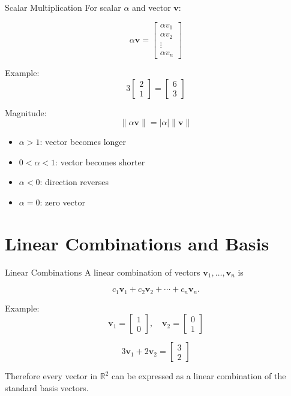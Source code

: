 \documentclass[aspectratio=169]{beamer}
\begin{document}
\begin{frame}{Scalar Multiplication}
For scalar $\alpha$ and vector $\mathbf v$:

\[
\alpha\mathbf v=
\begin{bmatrix}
\alpha v_1\\
\alpha v_2\\
\vdots\\
\alpha v_n
\end{bmatrix}
\]

Example:
\[
3\begin{bmatrix}2\\1\end{bmatrix}
=
\begin{bmatrix}6\\3\end{bmatrix}
\]

Magnitude:
\[
\|\alpha\mathbf v\|=|\alpha|\|\mathbf v\|
\]

\begin{itemize}
\item $\alpha>1$: vector becomes longer
\item $0<\alpha<1$: vector becomes shorter
\item $\alpha<0$: direction reverses
\item $\alpha=0$: zero vector
\end{itemize}
\end{frame}

\section{Linear Combinations and Basis}

\begin{frame}{Linear Combinations}
A linear combination of vectors $\mathbf v_1,\ldots,\mathbf v_n$ is

\[
c_1\mathbf v_1+c_2\mathbf v_2+\cdots+c_n\mathbf v_n.
\]

Example:
\[
\mathbf v_1=\begin{bmatrix}1\\0\end{bmatrix},
\quad
\mathbf v_2=\begin{bmatrix}0\\1\end{bmatrix}
\]

\[
3\mathbf v_1+2\mathbf v_2
=
\begin{bmatrix}3\\2\end{bmatrix}
\]

Therefore every vector in $\mathbb R^2$ can be expressed as a linear combination of the standard basis vectors.
\end{frame}
\end{document}
